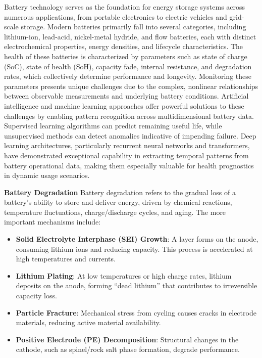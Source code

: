 Battery technology serves as the foundation for energy storage systems across numerous applications, from portable electronics to electric vehicles and grid-scale storage. Modern batteries primarily fall into several categories, including lithium-ion, lead-acid, nickel-metal hydride, and flow batteries, each with distinct electrochemical properties, energy densities, and lifecycle characteristics. The health of these batteries is characterized by parameters such as state of charge (SoC), state of health (SoH), capacity fade, internal resistance, and degradation rates, which collectively determine performance and longevity. Monitoring these parameters presents unique challenges due to the complex, nonlinear relationships between observable measurements and underlying battery conditions. Artificial intelligence and machine learning approaches offer powerful solutions to these challenges by enabling pattern recognition across multidimensional battery data. Supervised learning algorithms can predict remaining useful life, while unsupervised methods can detect anomalies indicative of impending failure. Deep learning architectures, particularly recurrent neural networks and transformers, have demonstrated exceptional capability in extracting temporal patterns from battery operational data, making them especially valuable for health prognostics in dynamic usage scenarios.


\textbf{Battery Degradation}
Battery degradation refers to the gradual loss of a battery’s ability to store and deliver
energy, driven by chemical reactions, temperature fluctuations, charge/discharge cycles,
and aging. The more important mechanisms include:

\begin{itemize}
    \item \textbf{Solid Electrolyte Interphase (SEI) Growth}: A layer forms on the anode, consuming lithium ions and reducing capacity. This process is accelerated at high temperatures and currents.
    \item \textbf{Lithium Plating}: At low temperatures or high charge rates, lithium deposits on the anode, forming ``dead lithium'' that contributes to irreversible capacity loss.
    \item \textbf{Particle Fracture}: Mechanical stress from cycling causes cracks in electrode materials, reducing active material availability.
    \item \textbf{Positive Electrode (PE) Decomposition}: Structural changes in the cathode, such as spinel/rock salt phase formation, degrade performance.
\end{itemize}

